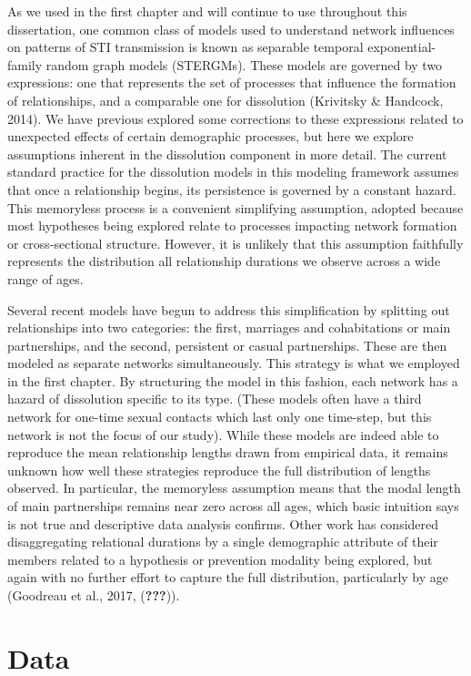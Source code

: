 \documentclass [11pt, proquest] {uwthesis}[2015/03/03]
\begin{document}
As we used in the first chapter and will continue to use throughout this
dissertation, one common class of models used to understand network
influences on patterns of STI transmission is known as separable
temporal exponential-family random graph models (STERGMs). These models
are governed by two expressions: one that represents the set of
processes that influence the formation of relationships, and a
comparable one for dissolution (Krivitsky \& Handcock, 2014). We have
previous explored some corrections to these expressions related to
unexpected effects of certain demographic processes, but here we explore
assumptions inherent in the dissolution component in more detail. The
current standard practice for the dissolution models in this modeling
framework assumes that once a relationship begins, its persistence is
governed by a constant hazard. This memoryless process is a convenient
simplifying assumption, adopted because most hypotheses being explored
relate to processes impacting network formation or cross-sectional
structure. However, it is unlikely that this assumption faithfully
represents the distribution all relationship durations we observe across
a wide range of ages.

Several recent models have begun to address this simplification by
splitting out relationships into two categories: the first, marriages
and cohabitations or main partnerships, and the second, persistent or
casual partnerships. These are then modeled as separate networks
simultaneously. This strategy is what we employed in the first chapter.
By structuring the model in this fashion, each network has a hazard of
dissolution specific to its type. (These models often have a third
network for one-time sexual contacts which last only one time-step, but
this network is not the focus of our study). While these models are
indeed able to reproduce the mean relationship lengths drawn from
empirical data, it remains unknown how well these strategies reproduce
the full distribution of lengths observed. In particular, the memoryless
assumption means that the modal length of main partnerships remains near
zero across all ages, which basic intuition says is not true and
descriptive data analysis confirms. Other work has considered
disaggregating relational durations by a single demographic attribute of
their members related to a hypothesis or prevention modality being
explored, but again with no further effort to capture the full
distribution, particularly by age (Goodreau et al., 2017,
({\textbf{???}})).

\section{Data}\label{data}
\end{document}
